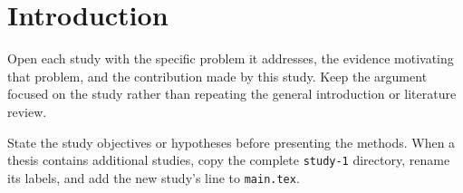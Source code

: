 \section{Introduction}
\label{sec:study-one-introduction}

Open each study with the specific problem it addresses, the evidence motivating
that problem, and the contribution made by this study. Keep the argument focused
on the study rather than repeating the general introduction or literature review.

State the study objectives or hypotheses before presenting the methods. When a
thesis contains additional studies, copy the complete \texttt{study-1} directory,
rename its labels, and add the new study's \verb|| line to \texttt{main.tex}.
